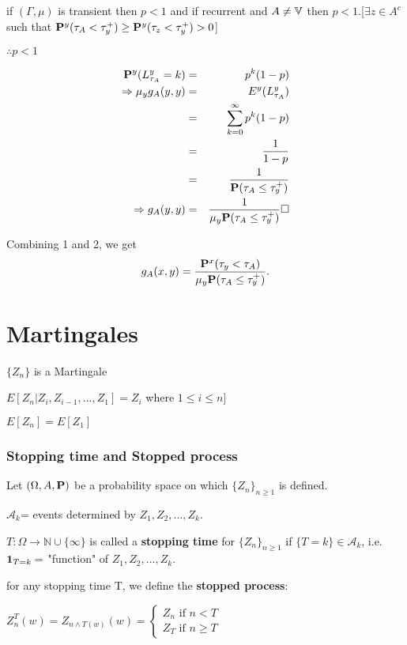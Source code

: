 \documentclass[main]{subfiles}
\begin{document}
if $(\Gamma, \mu)$ is transient then $p<1$ and if recurrent and $A \neq \V$ then $p<1$.[$\exists z \in A^c$ such that $\P^y(\tau_A < \tau_y^+) \geq \P^y(\tau_z < \tau_y^+)>0 $]

$\therefore p<1$

\begin{eqnarray*}
     \P^y(L_{\tau_A}^y=k) &=& p^k(1-p) \\
     \Rightarrow \mu_y g_A(y,y) &=& E^y(L_{\tau_A}^y) \\
     &=& \sum_{k=0}^{\infty} p^k(1-p) \\
     &=& \frac{1}{1-p} \\
     &=& \frac{1}{\P(\tau_A \leq \tau_y^+)} \\
     \Rightarrow g_A(y,y) &=& \frac{1}{\mu_y \P(\tau_A \leq \tau_y^+)} \square
\end{eqnarray*}

Combining 1 and 2, we get $$g_A(x,y)=\frac{\P^x(\tau_y< \tau_A)}{\mu_y \P(\tau_A \leq \tau_y^+)}.$$
\part{Martingales}
$\{Z_n\}$ is a Martingale

$E[Z_n|Z_i, Z_{i-1}, ... , Z_1]=Z_i$ where $1 \leq i \leq n ]$

$E[Z_n]=E[Z_1]$

\section{Stopping time and Stopped process}
\begin{definition}
     Let $(\Omega, A, \P)$ be a probability space on which $\{Z_n\}_{n\geq 1}$ is defined.

     $\mathscr{A}_k$= events determined by $Z_1, Z_2, ... ,Z_k$.

     $T: \Omega \longrightarrow \mathbb{N} \cup \{\infty\}$ is called a \textbf{stopping time} for $\{Z_n\}_{n\geq 1}$ if $\{T=k\} \in \mathscr{A}_k$, i.e.  $\1_{T=k}=$ "function" of $Z_1, Z_2, ... ,Z_k$.
\end{definition}

\begin{definition}
     for any stopping time T, we define the \textbf{stopped process}:

     $Z_n^T(w) = Z_{n \wedge T(w)}(w)=
          \begin{cases}
               Z_n \text{ if }n<T \\
               Z_T \text{ if } n \geq T
          \end{cases}$
\end{definition}
\end{document}
